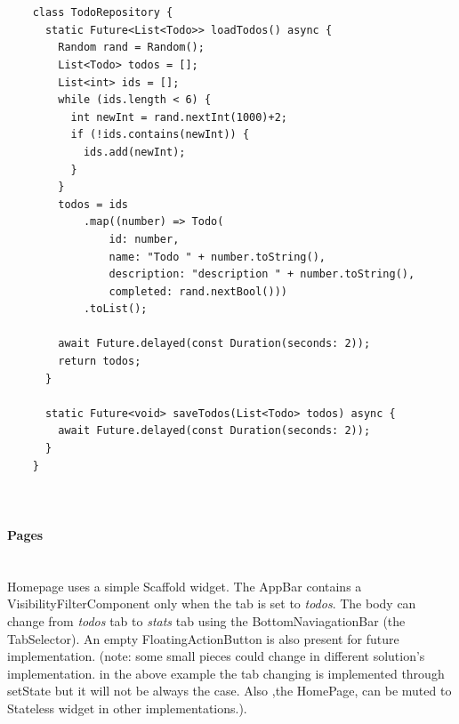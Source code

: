 	\mbox{}\\
	\begin{code}
	 \mbox{}
			\label{code:2.5}

	\begin{verbatim}
	
	class TodoRepository {
	  static Future<List<Todo>> loadTodos() async {
	    Random rand = Random();
	    List<Todo> todos = [];
	    List<int> ids = [];
	    while (ids.length < 6) {
	      int newInt = rand.nextInt(1000)+2;
	      if (!ids.contains(newInt)) {
	        ids.add(newInt);
	      }
	    }
	    todos = ids
	        .map((number) => Todo(
	            id: number,
	            name: "Todo " + number.toString(),
	            description: "description " + number.toString(),
	            completed: rand.nextBool()))
	        .toList();
	
	    await Future.delayed(const Duration(seconds: 2));
	    return todos;
	  }
	
	  static Future<void> saveTodos(List<Todo> todos) async {
	    await Future.delayed(const Duration(seconds: 2));
	  }
	}
	
	
	\end{verbatim}
	\end{code}
	\mbox{}
	
	
	\paragraph{Pages} \mbox{} \\
	\label{par:todo_app_pages}
Homepage uses a simple Scaffold widget. The AppBar contains a VisibilityFilterComponent only when the tab is set to \textit{todos}. The body can change from \textit{todos} tab to \textit{stats} tab using the BottomNaviagationBar (the TabSelector). An empty FloatingActionButton is also present for future implementation.
	(note: some small pieces could change in different solution’s implementation. in the above example the tab changing is implemented through setState but it will not be always the case. Also ,the HomePage, can be muted to Stateless widget in other implementations.).
	
